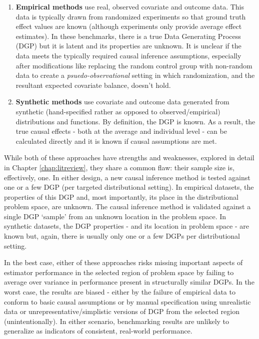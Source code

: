 \documentclass[../main.tex]{subfiles}
\begin{document}
\begin{enumerate}
    \item \textbf{Empirical methods} use real, observed covariate and outcome data. This data is typically drawn from randomized experiments so that ground truth effect values are known (although experiments only provide average effect estimates). In these benchmarks, there is a true Data Generating Process (DGP) but it is latent and its properties are unknown. It is unclear if the data meets the typically required causal inference assumptions, especially after modifications like replacing the random control group with non-random data to create a \textit{psuedo-observational} setting in which randomization, and the resultant expected covariate balance, doesn't hold.

    \item \textbf{Synthetic methods} use covariate and outcome data generated from synthetic (hand-specified rather as opposed to observed/empirical) distributions and functions. By definition, the DGP is known. As a result, the true causal effects - both at the average and individual level - can be calculated directly and it is known if causal assumptions are met.
\end{enumerate}

While both of these approaches have strengths and weaknesses, explored in detail in Chapter \ref{chap:litreview}, they share a common flaw: their sample size is, effectively, one. In either design, a new causal inference method is tested against one or a few DGP (per targeted distributional setting). In empirical datasets, the properties of this DGP and, most importantly, its place in the distributional problem space, are unknown. The causal inference method is validated against a single DGP `sample' from an unknown location in the problem space. In synthetic datasets, the DGP properties - and its location in problem space - are known but, again, there is usually only one or a few DGPs per distributional setting.

\vspace{\baselineskip}

In the best case, either of these approaches risks missing important aspects of estimator performance in the selected region of problem space by failing to average over variance in performance present in structurally similar DGPs. In the worst case, the results are biased - either by the failure of empirical data to conform to basic causal assumptions or by manual specification using unrealistic data or unrepresentative/simplistic versions of DGP from the selected region (unintentionally). In either scenario, benchmarking results are unlikely to generalize as indicators of consistent, real-world performance.
\end{document}
